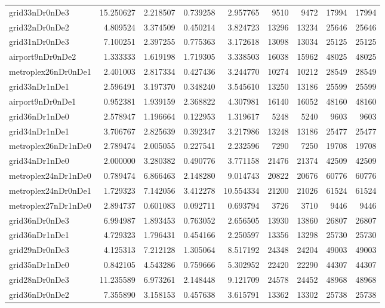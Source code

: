 \begin{longtable}{|l|r|r|r|r|r|r|r|r|}
grid33nDr0nDe3 & 15.250627 & 2.218507 & 0.739258 & 2.957765 & 9510 & 9472 & 17994 & 17994 \\
grid32nDr0nDe2 & 4.809524 & 3.374509 & 0.450214 & 3.824723 & 13296 & 13234 & 25646 & 25646 \\
grid31nDr0nDe3 & 7.100251 & 2.397255 & 0.775363 & 3.172618 & 13098 & 13034 & 25125 & 25125 \\
airport9nDr0nDe2 & 1.333333 & 1.619198 & 1.719305 & 3.338503 & 16038 & 15962 & 48025 & 48025 \\
metroplex26nDr0nDe1 & 2.401003 & 2.817334 & 0.427436 & 3.244770 & 10274 & 10212 & 28549 & 28549 \\
grid33nDr1nDe1 & 2.596491 & 3.197370 & 0.348240 & 3.545610 & 13250 & 13186 & 25599 & 25599 \\
airport9nDr0nDe1 & 0.952381 & 1.939159 & 2.368822 & 4.307981 & 16140 & 16052 & 48160 & 48160 \\
grid36nDr1nDe0 & 2.578947 & 1.196664 & 0.122953 & 1.319617 & 5248 & 5240 & 9603 & 9603 \\
grid34nDr1nDe1 & 3.706767 & 2.825639 & 0.392347 & 3.217986 & 13248 & 13186 & 25477 & 25477 \\
metroplex26nDr1nDe0 & 2.789474 & 2.005055 & 0.227541 & 2.232596 & 7290 & 7250 & 19708 & 19708 \\
grid34nDr1nDe0 & 2.000000 & 3.280382 & 0.490776 & 3.771158 & 21476 & 21374 & 42509 & 42509 \\
metroplex24nDr1nDe0 & 0.789474 & 6.866463 & 2.148280 & 9.014743 & 20822 & 20676 & 60776 & 60776 \\
metroplex24nDr0nDe1 & 1.729323 & 7.142056 & 3.412278 & 10.554334 & 21200 & 21026 & 61524 & 61524 \\
metroplex27nDr1nDe0 & 2.894737 & 0.601083 & 0.092711 & 0.693794 & 3726 & 3710 & 9446 & 9446 \\
grid36nDr0nDe3 & 6.994987 & 1.893453 & 0.763052 & 2.656505 & 13930 & 13860 & 26807 & 26807 \\
grid36nDr1nDe1 & 4.729323 & 1.796431 & 0.454166 & 2.250597 & 13356 & 13298 & 25730 & 25730 \\
grid29nDr0nDe3 & 4.125313 & 7.212128 & 1.305064 & 8.517192 & 24348 & 24204 & 49003 & 49003 \\
grid35nDr1nDe0 & 0.842105 & 4.543286 & 0.759666 & 5.302952 & 22420 & 22290 & 44307 & 44307 \\
grid28nDr0nDe3 & 11.235589 & 6.973261 & 2.148448 & 9.121709 & 24578 & 24452 & 48968 & 48968 \\
grid36nDr0nDe2 & 7.355890 & 3.158153 & 0.457638 & 3.615791 & 13362 & 13302 & 25738 & 25738 \\

\end{longtable}
